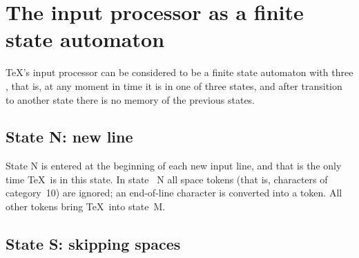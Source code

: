 \documentclass{book}
\begin{document}
\section{The input processor as a finite state automaton}
\label{input:states}

\TeX's input processor can be considered to be a finite state 
automaton with three ,
that is, at any moment in time it is in one of three states,
and after transition to another state there is no memory of the
previous states. 

\subsection{State {\italic N}: new line}

State {\italic N} is entered at the beginning of each new input line,
and that is the only time \TeX\ is in this state.  In state~{\italic
  N} all space tokens (that is, characters of
category~10) are ignored; an end-of-line character
is converted into a  token.  All other tokens bring \TeX\ into
state~{\italic M}.

\subsection{State {\italic S}: skipping spaces}
\end{document}
